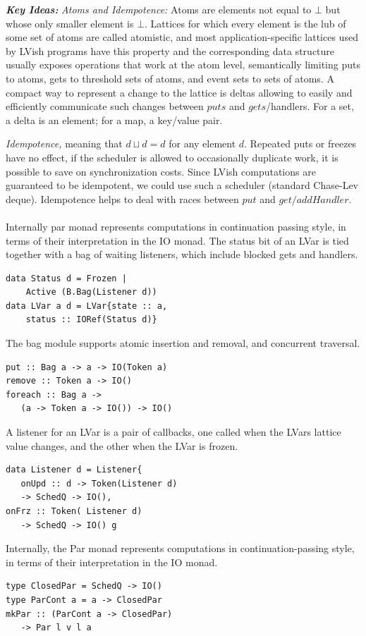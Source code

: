 \documentclass[twocolumn]{article}
\begin{document}
\textbf{\textit{Key Ideas:}} \textit{Atoms and Idempotence:} Atoms are elements not equal to $\bot$ but whose only smaller
element is $\bot$. Lattices for which every element is the lub of some set of atoms are called atomistic, and most application-specific lattices used by LVish programs have this property and the corresponding data structure usually exposes operations that
work at the atom level, semantically limiting puts to atoms, gets to threshold sets of atoms, and event sets to sets of atoms. A compact way to represent a change to the lattice is deltas allowing to easily and efficiently communicate such changes between
$puts$ and $gets$/handlers. For a set, a delta is an element; for a map, a key/value pair.\par
\textit{Idempotence,} meaning that $d\sqcup{d=d}$ for any element $d$. Repeated puts or freezes have no effect, if the scheduler is allowed to occasionally duplicate work, it is possible to save on synchronization costs. Since LVish computations are guaranteed to be idempotent, we could use such a scheduler (standard Chase-Lev deque\cite{sched}). Idempotence helps to deal with races between $put$ and $get/addHandler$. \\ \\
Internally par monad represents computations in continuation passing style, in terms of their interpretation in the IO monad. The status bit of an LVar is tied together with a bag of waiting listeners, which include blocked gets and handlers.
\begin{lstlisting}
data Status d = Frozen |
	Active (B.Bag(Listener d))
data LVar a d = LVar{state :: a,
	status :: IORef(Status d)} 
\end{lstlisting}
The bag module supports atomic insertion and removal, and concurrent traversal.
\begin{lstlisting}
put :: Bag a -> a -> IO(Token a)
remove :: Token a -> IO()
foreach :: Bag a ->
   (a -> Token a -> IO()) -> IO()
\end{lstlisting}
A listener for an LVar is a pair of callbacks, one called when the LVars lattice value changes, and the other when the LVar is frozen. 
\begin{lstlisting}
data Listener d = Listener{
   onUpd :: d -> Token(Listener d)
   -> SchedQ -> IO(),
onFrz :: Token( Listener d)
   -> SchedQ -> IO() g
\end{lstlisting}
Internally, the Par monad represents computations in continuation-passing style, in terms of their interpretation in the IO monad.
\begin{lstlisting}
type ClosedPar = SchedQ -> IO()
type ParCont a = a -> ClosedPar
mkPar :: (ParCont a -> ClosedPar)
   -> Par l v l a
\end{lstlisting}
\end{document}
